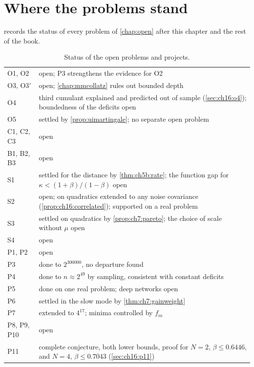\section{Where the problems stand}\label{sec:ch16:status}

 records the status of every problem of
\cref{chap:open} after this chapter and the rest of the book.

\begin{table}[t]
\centering\small
\setlength{\tabcolsep}{3pt}
\caption{Status of the open problems and projects.}
\label{tab:ch16:status}
\begin{tabular}{@{}l>{\raggedright\arraybackslash}p{}@{}}
\toprule
O1, O2 & open; P3 strengthens the evidence for O2 \\
O3, O3$'$ & open; \cref{chap:mmcollatz} rules out bounded depth \\
O4 & third cumulant explained and predicted out of sample (\cref{sec:ch16:o4}); boundedness of the deficits open \\
O5 & settled by \cref{prop:uimartingale}; no separate open problem \\
C1, C2, C3 & open \\
B1, B2, B3 & open \\
S1 & settled for the distance by \cref{thm:ch5b:rate}; the function gap for $\kappa<(1+\beta)/(1-\beta)$ open \\
S2 & open; on quadratics extended to any noise covariance (\cref{prop:ch16:correlated}); supported on a real problem \\
S3 & settled on quadratics by \cref{prop:ch7:pareto}; the choice of scale without $\mu$ open \\
S4 & open \\
P1, P2 & open \\
P3 & done to $2^{300000}$, no departure found \\
P4 & done to $n\approx2^{49}$ by sampling, consistent with constant deficits \\
P5 & done on one real problem; deep networks open \\
P6 & settled in the slow mode by \cref{thm:ch7:gainweight} \\
P7 & extended to $4^{17}$; minima controlled by $f_m$ \\
P8, P9, P10 & open \\
P11 & complete conjecture, both lower bounds, proof for $N=2$, $\beta\le0.6446$, and $N=4$, $\beta\le0.7043$ (\cref{sec:ch16:p11}) \\
\bottomrule
\end{tabular}
\end{table}


